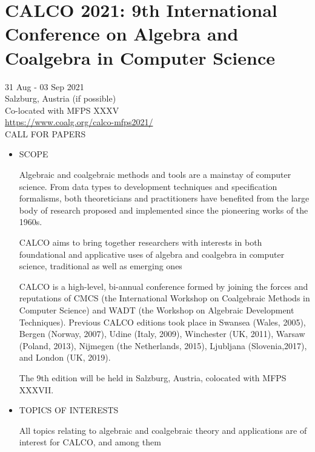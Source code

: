 \documentclass[prodmode,acmtecs]{acmsmall} %
\begin{document}
\begin{itemize}
\end{itemize}\section{CALCO 2021: 9th International Conference on Algebra and Coalgebra in Computer Science }\label{CALCO2021}  31 Aug - 03 Sep 2021  \\ 
  Salzburg, Austria (if possible) \\ 
  Co-located with MFPS XXXV \\ 
  \href{https://www.coalg.org/calco-mfps2021/}{https://www.coalg.org/calco-mfps2021/}\\ 
CALL FOR PAPERS 

\begin{itemize}\item  SCOPE  
 
  Algebraic and coalgebraic methods and tools are a mainstay of computer science. From data types to development techniques and specification formalisms, both theoreticians and practitioners have benefited from the large body of research proposed and implemented since the pioneering works of the 1960s.  
 
  CALCO aims to bring together researchers with interests in both foundational and applicative uses of algebra and coalgebra in computer science, traditional as well as emerging ones  
 
  CALCO is a high-level, bi-annual conference formed by joining the forces and reputations of CMCS (the International Workshop on Coalgebraic Methods in Computer Science) and WADT (the Workshop on Algebraic Development Techniques). Previous CALCO editions took place in Swansea (Wales, 2005), Bergen (Norway, 2007), Udine (Italy, 2009), Winchester (UK, 2011), Warsaw (Poland, 2013), Nijmegen (the Netherlands, 2015), Ljubljana (Slovenia,2017), and London (UK, 2019).  
 
  The 9th edition will be held in Salzburg, Austria, colocated with MFPS XXXVII.  
 
\item  TOPICS OF INTERESTS  
 
  All topics relating to algebraic and coalgebraic theory and applications are of interest for CALCO, and among them  
 

\end{itemize}
\end{document}
